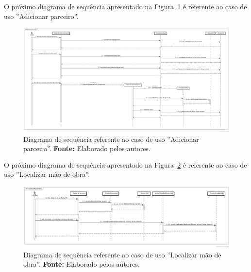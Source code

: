 O próximo diagrama de sequência apresentado na Figura~\ref{fig:ap1:diagrama_sequencia_adicionar_parceiro} é referente ao caso de uso ''Adicionar parceiro''.

\begin{landscape}
\newpage
\captionsetup[figure]{list=no}
\begin{figure}[h!]
	\centerline{\includegraphics[scale=0.3]{./imagens/apendices/diagrama-sequencia-adicionar-parceiros.png}}
	\caption[Diagrama de sequência referente ao caso de uso ''Adicionar parceiro''.]
	{Diagrama de sequência referente ao caso de uso ''Adicionar parceiro''. \textbf{Fonte:} Elaborado pelos autores.}
	\label{fig:ap1:diagrama_sequencia_adicionar_parceiro}
\end{figure}

O próximo diagrama de sequência apresentado na Figura~\ref{fig:ap1:diagrama_sequencia_localizar_mao_de_obra} é referente ao caso de uso ''Localizar mão de obra''.

\newpage
\captionsetup[figure]{list=no}
\begin{figure}[h!]
	\centerline{\includegraphics[scale=0.4]{./imagens/apendices/diagrama-sequencia-localizar-mao-de-obra.png}}
	\caption[Diagrama de sequência referente ao caso de uso ''Localizar mão de obra''.]
	{Diagrama de sequência referente ao caso de uso ''Localizar mão de obra''. \textbf{Fonte:} Elaborado pelos autores.}
	\label{fig:ap1:diagrama_sequencia_localizar_mao_de_obra}
\end{figure}


\end{landscape}
